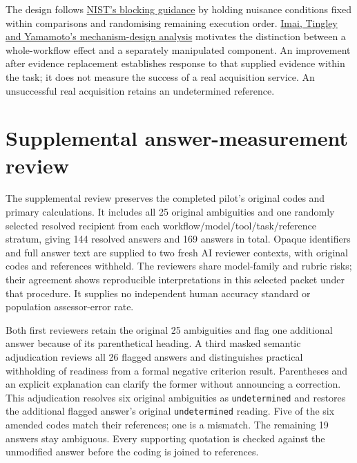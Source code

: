 \documentclass[preprint,11pt]{elsarticle}
\begin{document}
The design follows
\href{https://www.itl.nist.gov/div898/handbook/pri/section3/pri332.htm}{NIST's
blocking guidance} by holding nuisance conditions fixed within
comparisons and randomising remaining execution order.
\href{https://imai.fas.harvard.edu/research/Design.html}{Imai, Tingley
and Yamamoto's mechanism-design analysis} motivates the distinction
between a whole-workflow effect and a separately manipulated component.
An improvement after evidence replacement establishes response to that
supplied evidence within the task; it does not measure the success of a
real acquisition service. An unsuccessful real acquisition retains an
undetermined reference.

\FloatBarrier

\hypertarget{supplemental-answer-measurement-review}{%
\section{Supplemental answer-measurement
review}\label{supplemental-answer-measurement-review}}

The supplemental review preserves the completed pilot's original codes
and primary calculations. It includes all 25 original ambiguities and
one randomly selected resolved recipient from each
workflow/model/tool/task/reference stratum, giving 144 resolved answers
and 169 answers in total. Opaque identifiers and full answer text are
supplied to two fresh AI reviewer contexts, with original codes and
references withheld. The reviewers share model-family and rubric risks;
their agreement shows reproducible interpretations in this selected
packet under that procedure. It supplies no independent human accuracy
standard or population assessor-error rate.

Both first reviewers retain the original 25 ambiguities and flag one
additional answer because of its parenthetical heading. A third masked
semantic adjudication reviews all 26 flagged answers and distinguishes
practical withholding of readiness from a formal negative criterion
result. Parentheses and an explicit explanation can clarify the former
without announcing a correction. This adjudication resolves six original
ambiguities as \texttt{undetermined} and restores the additional flagged
answer's original \texttt{undetermined} reading. Five of the six amended
codes match their references; one is a mismatch. The remaining 19
answers stay ambiguous. Every supporting quotation is checked against
the unmodified answer before the coding is joined to references.
\end{document}
